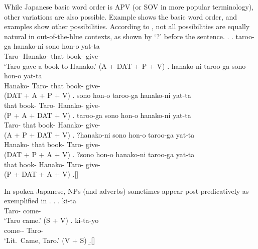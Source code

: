 While Japanese basic word order is APV (or SOV in more popular terminology),
other variations are also possible.
Example \Next[a] shows the basic word order, and
examples \Next[b--f] show other possibilities.
According to ,
not all possibilities are equally natural in out-of-the-blue contexts,
as shown by `?' before the sentence.
%
\ex.
 \ag. taroo-ga hanako-ni sono hon-o yat-ta \\
      Taro- Hanako- that book- give- \\
      `Taro gave a book to Hanako.' \hfill{(A + DAT + P + V)}
 \bg. hanako-ni taroo-ga sono hon-o yat-ta \\
      Hanako- Taro- that book- give- \\
      \hfill{(DAT + A + P + V)}
 \bg. sono hon-o taroo-ga hanako-ni yat-ta \\
      that book- Taro- Hanako- give- \\
      \hfill{(P + A + DAT + V)}
 \bg. taroo-ga sono hon-o hanako-ni yat-ta \\
      Taro- that book- Hanako- give- \\
      \hfill{(A + P + DAT + V)}
 \bg. ?hanako-ni sono hon-o taroo-ga yat-ta \\
      Hanako- that book- Taro- give- \\
      \hfill{(DAT + P + A + V)}
 \bg. ?sono hon-o hanako-ni taroo-ga yat-ta \\
      that book- Hanako-  Taro- give- \\
      \hfill{(P + DAT + A + V)}
 \b.[] \hfill{\cite[260]{shibatani90}}

In spoken Japanese,
NPs (and adverbs) sometimes appear post-predicatively as exemplified in \Next[b].
%
\ex.
 \ag.  ki-ta \\
      Taro- come- \\
      `Taro came.' \hfill{(S + V)}
 \bg. ki-ta-yo  \\
      come-- Taro- \\
      `Lit.~Came, Taro.' \hfill{(V + S)}
 \b.[] \hfill{\cite[258--259]{shibatani90}}



